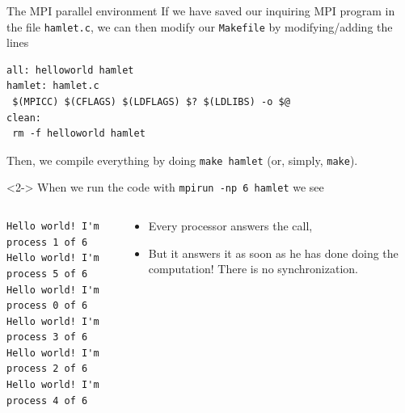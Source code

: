 \documentclass{beamer}
\begin{document}
\begin{frame}[fragile]{The MPI parallel environment}
If we have saved our inquiring MPI program in the file \texttt{hamlet.c}, we can then modify our \texttt{Makefile} by modifying/adding the lines
\begin{verbatim}
all: helloworld hamlet
hamlet: hamlet.c
 $(MPICC) $(CFLAGS) $(LDFLAGS) $? $(LDLIBS) -o $@
clean:
 rm -f helloworld hamlet
\end{verbatim}
Then, we compile everything by doing \texttt{make hamlet} (or, simply, \texttt{make}).

\begin{onlyenv}<2->
When we run the code with \texttt{mpirun -np 6 hamlet} we see
\begin{columns}
\begin{column}{0.5\columnwidth}
\begin{verbatim}
Hello world! I'm process 1 of 6
Hello world! I'm process 5 of 6
Hello world! I'm process 0 of 6
Hello world! I'm process 3 of 6
Hello world! I'm process 2 of 6
Hello world! I'm process 4 of 6
\end{verbatim}
\end{column}
\begin{column}{0.5\columnwidth}
\begin{itemize}
	\item<3-> Every processor answers the call,
	\item<4-> But it answers it as soon as he has done doing the computation! There is \alert{no synchronization}.
\end{itemize}
\end{column}
\end{columns}
\end{onlyenv}
\end{frame}
\end{document}
